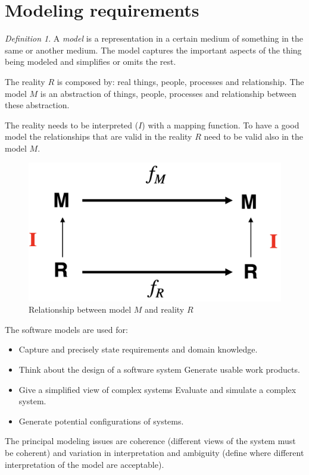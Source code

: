 \documentclass[12pt, a4paper]{report}
\theoremstyle{remark}
\newtheorem*{remark}{Definition}
\begin{document}
\section{Modeling requirements}
    \begin{remark}
        A \emph{model} is a representation in a certain medium of something in the same or another medium. The model captures the important aspects of the thing being modeled and simplifies or omits the rest. 
    \end{remark}
    The reality $R$ is composed by: real things, people, processes and relationship. The model $M$ is an abstraction of things, people, processes and relationship between these abstraction. 
    \par
    The reality needs to be interpreted ($I$) with a mapping function. To have a good model the relationships that are valid in the reality $R$ need to be valid also in the model $M$.
    \begin{figure}
        \centering
        \includegraphics[width=1\linewidth]{images/modeling.png}
        \caption{Relationship between model $M$ and reality $R$}
    \end{figure}
    The software models are used for: 
    \begin{itemize}
        \item Capture and precisely state requirements and domain knowledge.
        \item Think about the design of a software system Generate usable work products.
        \item Give a simplified view of complex systems Evaluate and simulate a complex system.
        \item Generate potential configurations of systems.
    \end{itemize}
    The principal modeling issues are coherence (different views of the system must be coherent) and variation in interpretation and ambiguity (define where different interpretation of the model are acceptable).
\end{document}
